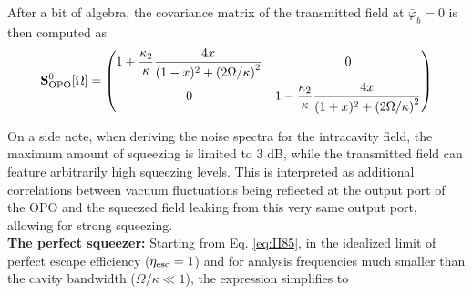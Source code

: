 After a bit of algebra, the covariance matrix of the transmitted field at $\bar \varphi_b = 0$ is then computed as
\begin{equation}
      \mathbf{S}^{0}_{\rm OPO}[\Omega] =\begin{pmatrix}
        1 + \dfrac{\kappa_2}{\kappa} \dfrac{4x}{(1- x)^2+ \left(2\Omega/\kappa\right)^2} & 0 \\[10pt]
        0 & 1 - \dfrac{\kappa_2}{\kappa} \dfrac{4x}{(1+ x)^2+ \left(2\Omega/\kappa\right)^2} 
      \end{pmatrix}
      \label{eq:II85}
\end{equation}




On a side note, when deriving the noise spectra for the intracavity field, the maximum amount of squeezing is limited to 3 dB, while the transmitted field can feature arbitrarily high squeezing levels. This is interpreted as additional correlations between vacuum fluctuations being reflected at the output port of the OPO and the squeezed field leaking from this very same output port, allowing for strong squeezing. \\

\noindent \textbf{The perfect squeezer: } Starting from Eq. \eqref{eq:II85}, in the idealized limit of perfect escape efficiency ($\eta_{\rm esc}=1$) and for analysis frequencies much smaller than the cavity bandwidth ($\Omega/\kappa \ll 1$), the expression simplifies to

